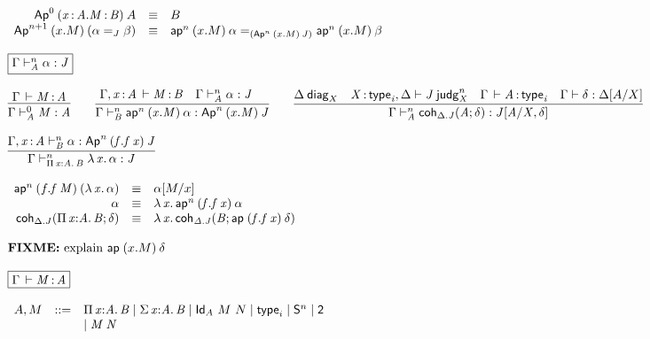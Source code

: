 \begin{small}
\[\begin{array}{l}
\begin{array}{rcl}
\Apn{0}{(\tptm{x}{A}.\tptm{M}{B})}{A} & \equiv & {B} \\
\Apn{n+1}{(x.M)}{(\homj{J}{\alpha}{\beta})} & \equiv & \homj{(\Apn{n}{(x.M)}{J})}{\apn{n}{(x.M)}{\alpha}}{\apn{n}{(x.M)}{\beta}} \\
\end{array}

\\ \\

\framebox{\ofjudg{\Gamma}{n}{A}{\alpha}{J}} \\ \\

\infer{\ofjudg{\Gamma}{0}{A}{M}{A}} 
      {\oftp{\Gamma}{M}{A}}
\qquad
\infer{\ofjudg{\Gamma}{n}{B}{\apn{n}{(x.M)}{\alpha}}{\Apn{n}{(x.M)}{J}}}
      {\oftp{\Gamma,\tptm{x}{A}}{M}{B} &
       \ofjudg{\Gamma}{n}{A}{\alpha}{J} &
      }
\qquad
\infer{\ofjudg{\Gamma}{n}{A}{\coh{\ctx{\Delta}.J}{A}{\delta}}{\tsubst{J}{A/X,\delta}}}
      {\wfdiag{\Delta}{X} &
       \wfjudg{\tptm{X}{\typ{i}},\Delta}{J}{n}{X} &
       \oftp{\Gamma}{A}{\typ{i}} &
       \wfdsubst{\Gamma}{\delta}{\tsubst{\ctx \Delta}{A/X}}
      }
\\ \\
\infer{\ofjudg{\Gamma}{n}{\picl{x}{A}{B}}{\ulam{x}{\alpha}}{J}}
      {\ofjudg{\Gamma,\tptm{x}{A}}{n}{B}{\alpha}{\Apn{n}{(f.\app{f}{x})}{J}}}

\\ \\

\begin{array}{rcl}
\apn{n}{(f.\app f M)}{(\ulam{x}{\alpha})} & \equiv & \tsubst{\alpha}{M/x} \\
\alpha & \equiv & \ulam{x}{\apn{n}{(f.\app f x)}{\alpha}} \\
\coh{\Delta.J}{\picl{x}{A}{B}}{\delta} & \equiv & \ulam{x}{\coh{\Delta.J}{B}{\apn{}{(f.\app f x)}{\delta}}}
\end{array}
\\ \\

\text{\FIXME{explain \apn{}{(x.M)}{\delta}}}

\\ \\

\framebox{\oftp{\Gamma}{M}{A}} \\ \\

\begin{array}{rcl}
A,M & ::= & \picl{x}{A}{B} \mid \sigmacl{x}{A}{B} \mid \idtp{A}{M}{N} \mid
\typ{i} \mid
\dsd{S}^n \mid \dsd{2} \\ 
& & \mid \app M N
\end{array}



\end{array}
\]
\end{small}
